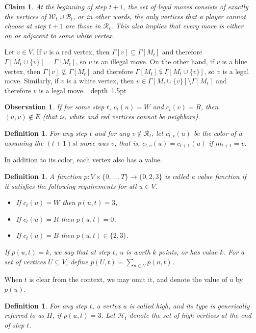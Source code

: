 \documentclass[11pt]{article}
\def\Proof{\par\noindent{\bf Proof:~}}
\def\blackslug{\hbox{\hskip 1pt \vrule width 4pt height 8pt
    depth 1.5pt \hskip 1pt}}
\def\QED{\quad\blackslug\lower 8.5pt\null\par}
\def\dnsitem{\vspace{-7pt}\item}
\newtheorem{definition}[theorem]{Definition}
\newtheorem{claim}[theorem]{Claim}
\newtheorem{observation}[theorem]{Observation}
\theoremstyle{definition}
\begin{document}
\begin{claim}
\label{claim:legal_moves}
At the beginning of step $t+1$, the set of legal moves consists of exactly the vertices of $\mathcal{W}_t \cup \mathcal{B}_t$, 
or in other words, the only vertices that a player cannot choose at step $t+1$ are those in $\mathcal{R}_t$.
This also implies that every move is either on or adjacent to some white vertex.
\end{claim}
\Proof
Let $v \in V$.
If $v$ is a red vertex, then $\Gamma[v] \subseteq \Gamma[M_t]$ and therefore $\Gamma[M_t \cup \{v\}] = \Gamma[M_t]$, so $v$ is an illegal move.
On the other hand,
if $v$ is a blue vertex, then $\Gamma[v] \not\subseteq \Gamma[M_t]$ and therefore ${\Gamma[M_t] \subsetneqq \Gamma[M_t \cup \{v\}]}$, so $v$ is a legal move.
Similarly, 
if $v$ is a white vertex, then $v \in \Gamma[M_t \cup \{v\}] \setminus \Gamma[M_t]$ and therefore $v$ is a legal move.
\QED

\begin{observation}
\label{obs:edges_no_r}
If for some step $t$, $c_t(u)=W$ and $c_t(v)=R$, then $(u,v) \notin E$ 
(that is, white and red vertices cannot be neighbors).
\end{observation}

\begin{definition}
For any step $t$ and for any $v \notin \mathcal{R}_t$, 
let $c_{t,v}(u)$ be the color of $u$ assuming the $(t+1)$st move was $v$, that is, $c_{t, v}(u) = c_{t+1}(u)$ if $m_{t+1} = v$.
\end{definition}

In addition to its color, each vertex also has a value.

\begin{definition}
A function $p : V \times \{0, ..., T\} \rightarrow \{0, 2, 3\}$ is called a \emph{value} function if it satisfies the following requirements for all $u \in V$.
\begin{itemize}
	\dnsitem If $c_t(u)=W$ then $p(u, t) = 3$,
	\dnsitem If $c_t(u)=R$ then $p(u, t) = 0$,
	\dnsitem If $c_t(u)=B$ then $p(u, t) \in \{2, 3\}$.
\end{itemize}
If $p(u, t)=k$, we say that at step $t$, $u$ is \emph{worth} $k$ points, or \emph{has value} $k$.
For a set of vertices $U \subseteq V$, define $p(U, t) = \sum_{u \in U}p(u, t)$. 
\end{definition}

When $t$ is clear from the context, we may omit it, and denote the value of $u$ by $p(u)$.

\begin{definition}
For any step $t$, a vertex $u$ is called \emph{high}, 
and its type is generically referred to as $H$, if $p(u, t) = 3$.
Let $\mathcal{H}_t$ denote the set of high vertices at the end of step $t$.
\end{definition}
\end{document}
